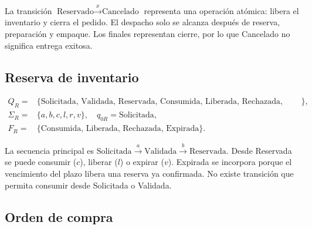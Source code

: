 \documentclass[11pt,a4paper]{article}
\begin{document}
\begin{center}
\end{center}

La transición $\text{Reservado}\xrightarrow{x}\text{Cancelado}$ representa una operación atómica: libera el inventario y cierra el pedido. El despacho solo se alcanza después de reserva, preparación y empaque. Los finales representan cierre, por lo que Cancelado no significa entrega exitosa.

\subsection{Reserva de inventario}

\begin{align*}
Q_R={}&\{\text{Solicitada, Validada, Reservada, Consumida, Liberada, Rechazada, Expirada}\},\\
\Sigma_R={}&\{a,b,c,l,r,v\},\quad q_{0R}=\text{Solicitada},\\
F_R={}&\{\text{Consumida, Liberada, Rechazada, Expirada}\}.
\end{align*}

La secuencia principal es $\text{Solicitada}\xrightarrow{a}\text{Validada}\xrightarrow{b}\text{Reservada}$. Desde Reservada se puede consumir ($c$), liberar ($l$) o expirar ($v$). Expirada se incorpora porque el vencimiento del plazo libera una reserva ya confirmada. No existe transición que permita consumir desde Solicitada o Validada.

\subsection{Orden de compra}
\end{document}
